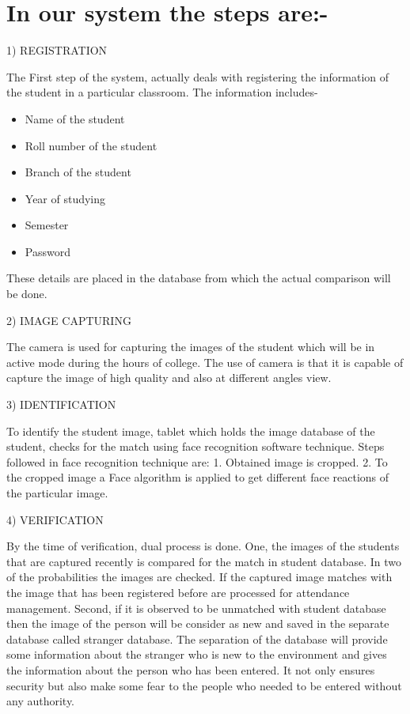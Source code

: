 \section{ In our system the steps are:-}


1) REGISTRATION 

The First step of the system, actually deals with registering the information of the student in a particular classroom. The information includes-
\begin{itemize}
\item Name of the student 
\item Roll number of  the student 
\item Branch of the student 
\item Year of studying
\item  Semester
\item Password
\end{itemize}
These details are placed in the database from which the actual comparison will be done. 

2) IMAGE CAPTURING 

The camera is  used for capturing the images of the student which will be in active mode during the hours of college. The use of camera is that it is capable of capture the image of high quality and also at different angles view. \cite{pdya}

3) IDENTIFICATION 

To identify the student image, tablet which holds the image database of the student, checks for the match using face recognition software technique. \cite{pdya}
Steps followed in   face recognition technique are: 
1. Obtained image is cropped. 
2. To the cropped image a Face algorithm is applied to get different face reactions of the particular image. 

4) VERIFICATION 

By the time of verification, dual process is done. One, the images of the students that are captured recently is compared for the match in student database. In two of the probabilities the images are checked. If the captured image matches with the image that has been registered before are processed for attendance management. Second, if it is observed to be unmatched with student database then the image of the person will be consider as new and saved in the separate database called stranger database. The separation of the database will provide some information about the stranger who is new to the environment and gives the information about the person who has been entered. It not only ensures security but also make some fear to the people who needed to be entered without any authority.\cite{sups} 

